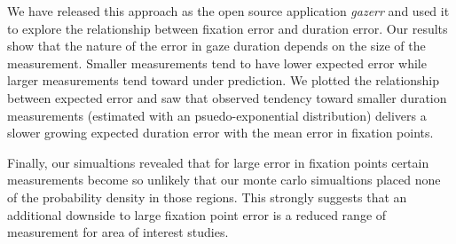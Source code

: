 \documentclass[12pt,a4paper]{article}
\numberwithin{equation}{section}
\begin{document}
We have released this approach as the open source application \textit{gazerr} and used it to explore
the relationship between fixation error and duration error. Our results show that the nature
of the error in gaze duration depends on the size of the measurement. Smaller measurements
tend to have lower expected error while larger measurements tend toward under prediction. We plotted
the relationship between expected error and saw that observed tendency toward smaller duration
measurements (estimated with an psuedo-exponential distribution) delivers a slower growing
expected duration error with the mean error in fixation points.

Finally, our simualtions revealed that for large error in fixation points certain measurements
become so unlikely that our monte carlo simualtions placed none of the probability density
in those regions. This strongly suggests that an additional downside to large fixation point error
is a reduced range of measurement for area of interest studies.




\end{document}
